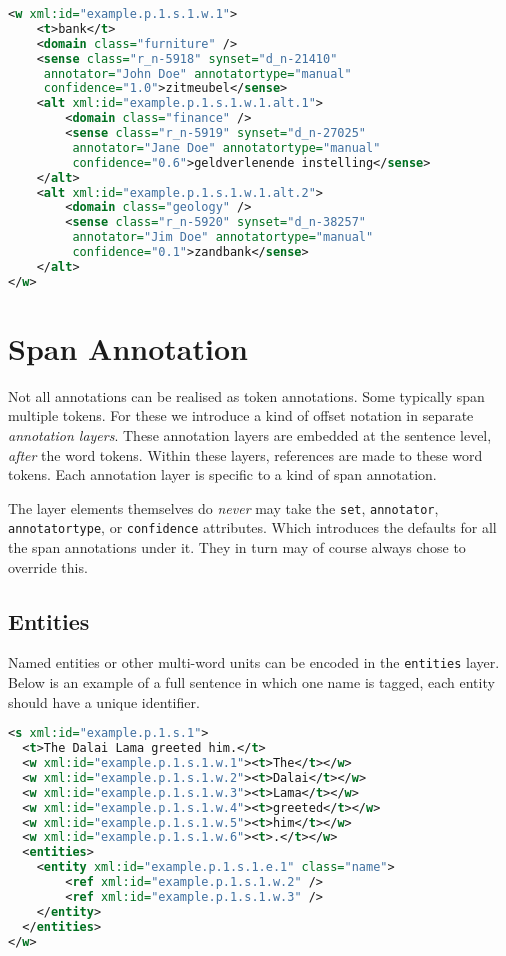 \documentclass[a4paper,12pt]{report}
\begin{document}
\begin{lstlisting}[language=xml]
<w xml:id="example.p.1.s.1.w.1">
    <t>bank</t>
    <domain class="furniture" />
    <sense class="r_n-5918" synset="d_n-21410" 
     annotator="John Doe" annotatortype="manual" 
     confidence="1.0">zitmeubel</sense>
    <alt xml:id="example.p.1.s.1.w.1.alt.1">
        <domain class="finance" />
        <sense class="r_n-5919" synset="d_n-27025"
         annotator="Jane Doe" annotatortype="manual" 
         confidence="0.6">geldverlenende instelling</sense>        
    </alt>
    <alt xml:id="example.p.1.s.1.w.1.alt.2">
        <domain class="geology" />
        <sense class="r_n-5920" synset="d_n-38257"
         annotator="Jim Doe" annotatortype="manual"
         confidence="0.1">zandbank</sense>        
    </alt>    
</w>
\end{lstlisting}


\section{Span Annotation}

Not all annotations can be realised as token annotations. Some typically span multiple tokens. For these we introduce a kind of offset notation in separate \emph{annotation layers}. These annotation layers are embedded at the sentence level, \emph{after} the word tokens. Within these layers, references are made to these word tokens. Each annotation layer is specific to a kind of span annotation.

The layer elements themselves do \emph{never} may take the \texttt{set}, \texttt{annotator}, \texttt{annotatortype}, or \texttt{confidence} attributes. Which introduces the defaults for all the span annotations under it. They in turn may of course always chose to override this.

\subsection{Entities}

Named entities or other multi-word units can be encoded in the \texttt{entities} layer. Below is an example of a full sentence in which one name is tagged, each entity should have a unique identifier.


\begin{lstlisting}[language=xml]
<s xml:id="example.p.1.s.1">
  <t>The Dalai Lama greeted him.</t>
  <w xml:id="example.p.1.s.1.w.1"><t>The</t></w>
  <w xml:id="example.p.1.s.1.w.2"><t>Dalai</t></w>
  <w xml:id="example.p.1.s.1.w.3"><t>Lama</t></w>
  <w xml:id="example.p.1.s.1.w.4"><t>greeted</t></w>
  <w xml:id="example.p.1.s.1.w.5"><t>him</t></w>
  <w xml:id="example.p.1.s.1.w.6"><t>.</t></w>
  <entities>
    <entity xml:id="example.p.1.s.1.e.1" class="name">
        <ref xml:id="example.p.1.s.1.w.2" />
        <ref xml:id="example.p.1.s.1.w.3" />
    </entity>
  </entities>
</w>
\end{lstlisting}
\end{document}

